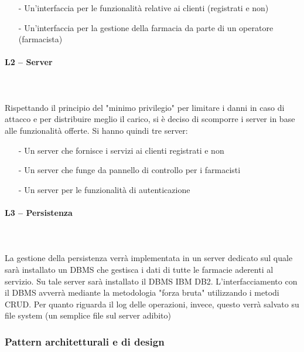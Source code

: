 \begin{itemize}
\item[-] Un'interfaccia per le funzionalità relative ai clienti (registrati e non)
\item[-] Un'interfaccia per la gestione della farmacia da parte di un operatore (farmacista)
\end{itemize}

\paragraph{L2 -- Server}\mbox{}\\ \\
Rispettando il principio del "minimo privilegio" per limitare i danni in caso di attacco e per distribuire meglio il carico, si è deciso di scomporre i server in base alle funzionalità offerte. Si hanno quindi tre server:

\begin{itemize}
\item[-] Un server che fornisce i servizi ai clienti registrati e non
\item[-] Un server che funge da pannello di controllo per i farmacisti
\item[-] Un server per le funzionalità di autenticazione
\end{itemize}

\paragraph{L3 -- Persistenza}\mbox{}\\ \\
La gestione della persistenza verrà implementata in un server dedicato sul quale sarà installato un DBMS che gestisca i dati di tutte le farmacie aderenti al servizio.
Su tale server sarà installato il DBMS IBM DB2.
L'interfacciamento con il DBMS avverrà mediante la metodologia "forza bruta" utilizzando i metodi CRUD.
Per quanto riguarda il log delle operazioni, invece, questo verrà salvato su file system (un semplice file sul server adibito)

\subsubsection{Pattern architetturali e di design}

